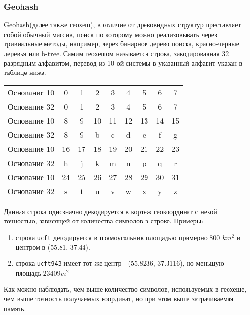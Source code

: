 \documentclass{article}
\begin{document}
\subsubsection{Geohash}
Geohash(далее также геохеш), в отличие от древовидных структур преставляет собой обычный массив, поиск по которому можно реализовывать через тривиальные методы, например, через бинарное дерево поиска, красно-черные деревья или b-tree.
Самим геохешом называется строка, закодированная 32 разрядным алфавитом, перевод из 10-ой системы в указанный алфавит указан в таблице ниже.
\begin{center}
\begin{tabular}{ c|c c c c c c c c }
 Основание 10 & 0 & 1 & 2 & 3 & 4 & 5 & 6 & 7 \\
 Основание 32 & 0 & 1 & 2 & 3 & 4 & 5 & 6 & 7 \\
  \hline\hline
 Основание 10 & 8 & 9 & 10 & 11 & 12 & 13 & 14 & 15 \\
 Основание 32 & 8 & 9 & b & c & d & e & f & g \\
  \hline\hline
 Основание 10 & 16 & 17 & 18 & 19 & 20 & 21 & 22 & 23  \\
 Основание 32 & h & j & k & m & n & p & q & r \\
  \hline\hline
 Основание 10 & 24 & 25 & 26 & 27 & 28 & 29 & 30 & 31 \\
 Основание 32 & s & t & u & v & w & x & y & z \\
\end{tabular}
\end{center}
Данная строка однозначно декодируется в кортеж геокоординат с некой точностью, зависящей от количества символов в строке. Примеры:
\begin{enumerate}
    \item строка \texttt{ucft} дегодируется в прямоугольник площадью примерно 800 $ km^2 $ и центром в (55.81, 37.44).
    \item строка \texttt{ucft943} имеет тот же центр - (55.8236, 37.3116), но меньшую площадь $23409 m^2$
\end{enumerate}
Как можно наблюдать, чем выше количество символов, используемых в геохеше, чем выше точность получаемых координат, но при этом выше затрачиваемая память.
\end{document}
